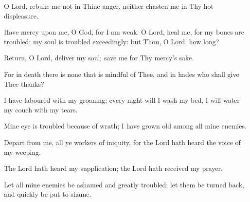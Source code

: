 O Lord, rebuke me not in Thine anger, neither chasten me in Thy hot displeasure.

Have mercy upon me, O God, for I am weak. O Lord, heal me, for my bones are troubled; my soul is troubled exceedingly: but Thou, O Lord, how long?

Return, O Lord, deliver my soul; save me for Thy mercy's sake.

For in death there is none that is mindful of Thee, and in hades who shall give Thee thanks?

I have laboured with my groaning; every night will I wash my bed, I will water my couch with my tears.

Mine eye is troubled because of wrath; I have grown old among all mine enemies.

Depart from me, all ye workers of iniquity, for the Lord hath heard the voice of my weeping.

The Lord hath heard my supplication; the Lord hath received my prayer.

Let all mine enemies be ashamed and greatly troubled; let them be turned back, and quickly be put to shame.
